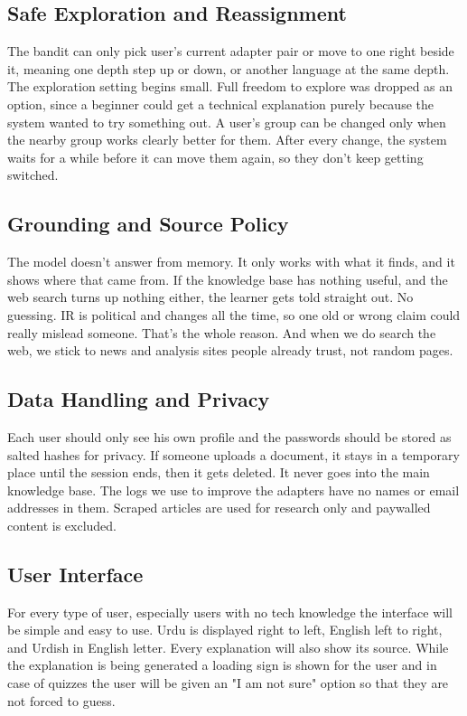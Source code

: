 \documentclass{FastFyp}
\begin{document}
\subsection{Safe Exploration and Reassignment}
The bandit can only pick user's current adapter pair or move to one right beside it, meaning one depth step up or down, or another language at the same depth. The exploration setting begins small. Full freedom to explore was dropped as an option, since a beginner could get a technical explanation purely because the system wanted to try something out. A user's group can be changed only when the nearby group works clearly better for them. After every change, the system waits for a while before it can move them again, so they don’t keep getting switched.

\subsection{Grounding and Source Policy}
The model doesn’t answer from memory. It only works with what it finds, and it shows where that came from. If the knowledge base has nothing useful, and the web search turns up nothing either, the learner gets told straight out. No guessing. IR is political and changes all the time, so one old or wrong claim could really mislead someone. That’s the whole reason. And when we do search the web, we stick to news and analysis sites people already trust, not random pages.

\subsection{Data Handling and Privacy}
Each user should only see his own profile and the passwords should be stored as salted hashes for privacy. If someone uploads a document, it stays in a temporary place until the session ends, then it gets deleted. It never goes into the main knowledge base. The logs we use to improve the adapters have no names or email addresses in them. Scraped articles are used for research only and paywalled content is excluded.

\subsection{User Interface}
For every type of user, especially users with no tech knowledge the interface will be simple and easy to use. Urdu is displayed right to left, English left to right, and Urdish in English letter. Every explanation will also show its source. While the explanation is being generated a loading sign is shown for the user and in case of quizzes the user will be given an "I am not sure" option so that they are not forced to guess.
\end{document}
